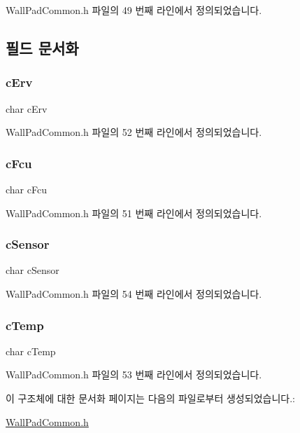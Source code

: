 Wall\+Pad\+Common.\+h 파일의 49 번째 라인에서 정의되었습니다.



\subsection{필드 문서화}
\mbox{\label{struct_st_last_send_a47a441ff5eafccfc6171e25c5ea0c311}} 
\subsubsection{\texorpdfstring{c\+Erv}{cErv}}
{\footnotesize\ttfamily char c\+Erv}



Wall\+Pad\+Common.\+h 파일의 52 번째 라인에서 정의되었습니다.

\mbox{\label{struct_st_last_send_ae99178f09a1a9fed4ba8f4603f165d17}} 
\subsubsection{\texorpdfstring{c\+Fcu}{cFcu}}
{\footnotesize\ttfamily char c\+Fcu}



Wall\+Pad\+Common.\+h 파일의 51 번째 라인에서 정의되었습니다.

\mbox{\label{struct_st_last_send_adaef2dbbc191c190520eab895effe14a}} 
\subsubsection{\texorpdfstring{c\+Sensor}{cSensor}}
{\footnotesize\ttfamily char c\+Sensor}



Wall\+Pad\+Common.\+h 파일의 54 번째 라인에서 정의되었습니다.

\mbox{\label{struct_st_last_send_a7ea4080d1f39154be7d7b1bfd6ff3987}} 
\subsubsection{\texorpdfstring{c\+Temp}{cTemp}}
{\footnotesize\ttfamily char c\+Temp}



Wall\+Pad\+Common.\+h 파일의 53 번째 라인에서 정의되었습니다.



이 구조체에 대한 문서화 페이지는 다음의 파일로부터 생성되었습니다.\+:\begin{DoxyCompactItemize}
\item 
\mbox{\hyperlink{_wall_pad_common_8h}{Wall\+Pad\+Common.\+h}}\end{DoxyCompactItemize}
